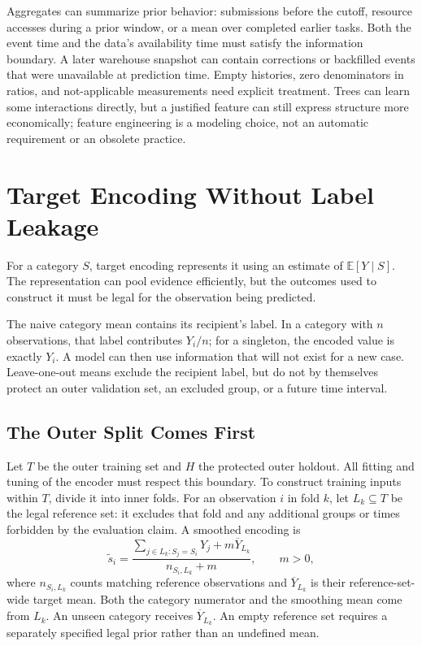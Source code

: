Aggregates can summarize prior behavior: submissions before the cutoff, resource accesses during a prior window, or a mean over completed earlier tasks. Both the event time and the data's availability time must satisfy the information boundary. A later warehouse snapshot can contain corrections or backfilled events that were unavailable at prediction time. Empty histories, zero denominators in ratios, and not-applicable measurements need explicit treatment. Trees can learn some interactions directly, but a justified feature can still express structure more economically; feature engineering is a modeling choice, not an automatic requirement or an obsolete practice.

\section{Target Encoding Without Label Leakage}
\label{sec:target-encoding}

For a category $S$, target encoding represents it using an estimate of $\mathbb E[Y\mid S]$. The representation can pool evidence efficiently, but the outcomes used to construct it must be legal for the observation being predicted.

The naive category mean contains its recipient's label. In a category with $n$ observations, that label contributes $Y_i/n$; for a singleton, the encoded value is exactly $Y_i$. A model can then use information that will not exist for a new case. Leave-one-out means exclude the recipient label, but do not by themselves protect an outer validation set, an excluded group, or a future time interval.

\subsection{The Outer Split Comes First}

Let $T$ be the outer training set and $H$ the protected outer holdout. All fitting and tuning of the encoder must respect this boundary. To construct training inputs within $T$, divide it into inner folds. For an observation $i$ in fold $k$, let $L_k\subseteq T$ be the legal reference set: it excludes that fold and any additional groups or times forbidden by the evaluation claim. A smoothed encoding is
\[
\widetilde s_i=
\frac{\sum_{j\in L_k:S_j=S_i}Y_j+m\overline Y_{L_k}}
{n_{S_i,L_k}+m},\qquad m>0,
\]
where $n_{S_i,L_k}$ counts matching reference observations and $\overline Y_{L_k}$ is their reference-set-wide target mean. Both the category numerator and the smoothing mean come from $L_k$. An unseen category receives $\overline Y_{L_k}$. An empty reference set requires a separately specified legal prior rather than an undefined mean.

